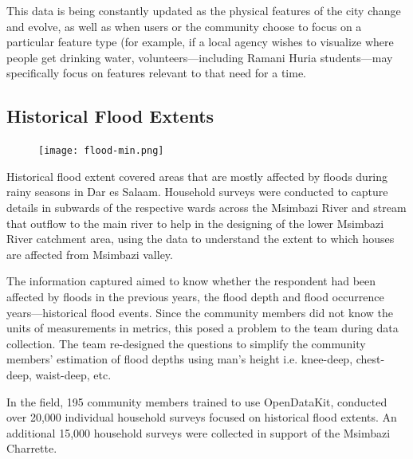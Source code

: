 \documentclass[a4paper,12pt,twoside]{article}
\begin{document}
This data is being constantly updated as the physical features of the city change and evolve, as well as when users or the community choose to focus on a particular feature type (for example, if a local agency wishes to visualize where people get drinking water, volunteers—including Ramani Huria students—may specifically focus on features relevant to that need for a time.
\newpage
\subsection{Historical Flood Extents}
\begin{figure}[h]
    \centering
    \texttt{[image: flood-min.png]}
    \label{fig:my_label}
\end{figure}
Historical flood extent covered areas that are mostly affected by floods during rainy seasons in Dar es Salaam. Household surveys were conducted to capture details in subwards of the respective wards across the Msimbazi River and stream that outflow to the main river to help in the designing of the lower Msimbazi River catchment area, using the data to understand the extent to which houses are affected from Msimbazi valley.

The information captured aimed to know whether the respondent had been affected by floods in the previous years, the flood depth and flood occurrence years---historical flood events. Since the community members did not know the units of measurements in metrics, this posed a problem to the team during data collection. The team re-designed the questions to simplify the community members’ estimation of flood depths using man’s height i.e. knee-deep, chest-deep, waist-deep, etc.

In the field, 195 community members trained to use OpenDataKit, conducted over 20,000 individual household surveys focused on historical flood extents. An additional 15,000 household surveys were collected in support of the Msimbazi Charrette. 
\newpage
\end{document}
